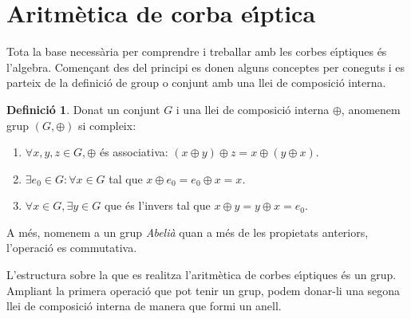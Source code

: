 \documentclass[12pt,twoside,catalan,a4paper]{book}%
\numberwithin{figure}{section}		%
\theoremstyle{definition}   			%
\newtheorem{defi}{Definici\'o}[chapter]%
\def\ce{corba e\lgem{}\'{\i}ptica}%
\def\ces{corbes e\lgem{}\'{\i}ptiques}%
\theoremstyle{saltolinea}   			%
\begin{document}
\section{Aritm\`etica de \ce}\label{sec:aritmEC}

Tota la base necess\`aria per comprendre i treballar amb les \ces{} \'es l'algebra. Comen\c{c}ant des del principi es donen alguns conceptes per coneguts i es parteix de la definici\'o de group o conjunt amb una llei de composici\'o interna.

\begin{defi}\label{def:group}
Donat un conjunt $G$ i una llei de composici\'o interna $\oplus$, anomenem grup $\left(G,\oplus\right)$ si compleix:
\begin{enumerate}
 \item $\forall x,y,z \in G, \oplus$ \'es associativa: $\left(x\oplus y\right) \oplus z = x\oplus \left( y \oplus x \right)$.
 \item $\exists e_0 \in G: \forall x \in G$ tal que $x \oplus e_0 = e_0 \oplus x = x$.
 \item $\forall x \in G, \exists y \in G$ que \'es l'invers tal que $x \oplus y = y \oplus x = e_0$.
\end{enumerate}
A m\'es, nomenem a un grup \emph{Abeli\`a} quan a m\'es de les propietats anteriors, l'operaci\'o es commutativa.
\end{defi}

L'estructura sobre la que es realitza l'aritm\`etica de \ces{} \'es un grup. Ampliant la primera operaci\'o que pot tenir un grup, podem donar-li una segona llei de composici\'o interna de manera que formi un anell.
\end{document}
